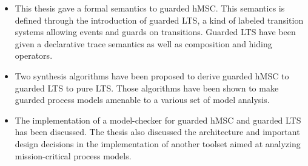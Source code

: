 \begin{itemize}
\item This thesis gave a formal semantics to guarded hMSC. This semantics is defined through the introduction of guarded LTS, a kind of labeled transition systems allowing events and guards on transitions. Guarded LTS have been given a declarative trace semantics as well as composition and hiding operators.
\item Two synthesis algorithms have been proposed to derive guarded hMSC to guarded LTS to pure LTS. Those algorithms have been shown to make guarded process models amenable to a various set of model analysis.
\item The implementation of a model-checker for guarded hMSC and guarded LTS has been discussed. The thesis also discussed the architecture and important design decisions in the implementation of another toolset aimed at analyzing mission-critical process models.
\end{itemize}



